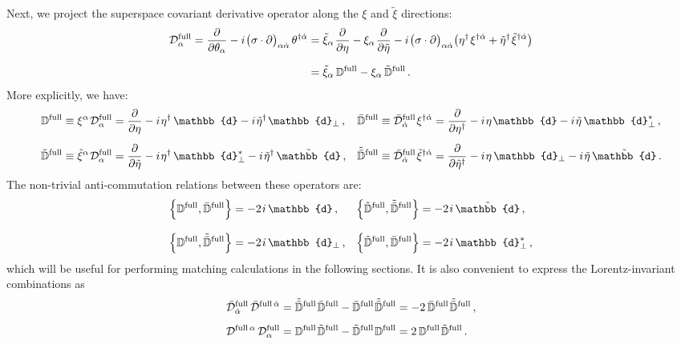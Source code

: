 \documentclass[12pt,document,nofootinbib,superscriptaddress,onecolumn,preprintnumbers,balancelastpage]{article}
\newcommand{\full}{\text{full}}
\newcommand{\s}{\hspace{0.8pt}}
\newcommand{\PP}{\mathbb{d}}
\newcommand{\D}{\mathbb{D}}
\begin{document}
\begin{spacing}{1.2}
Next, we project the superspace covariant derivative operator along the $\xi$ and $\tilde{\xi}$ directions:
%
\begin{align}
\mathcal{D}_\alpha^\full = \frac{\partial }{\partial \theta_\alpha} - i\s \big(\sigma \cdot \partial\big)_{\alpha \dot{\alpha}} \,\theta^{\dagger \dot{\alpha}} & =  \tilde{\xi}_\alpha\s \frac{\partial}{\partial \eta} - \xi_\alpha \s\frac{\partial}{\partial \tilde{\eta}} -i\s \big(\sigma \cdot \partial\big)_{\alpha \dot{\alpha}} \big(\eta^\dagger\s \xi^{\dagger \dot{\alpha}} + \tilde{\eta}^\dagger\s \tilde{\xi}^{\dagger \dot{\alpha}}\big) \notag\\[7pt] 
& =  \tilde{\xi}_\alpha\, \D^\full - \xi_\alpha\, \tilde{\D}^\full \, . 
\label{eq:DFullDecomposed}
\end{align}
%
More explicitly, we have:
%
\begin{align}
\label{eq:Dfull}
 \nonumber
\D^\full  \equiv \xi^\alpha\s \mathcal{D}_{\alpha}^\full &=    \frac{\partial}{\partial \eta} - i\s   \eta^\dagger\, \PP -i\s \tilde{\eta}^\dagger \s\PP_\perp \,, &
%
\bar{\D}^\full  \equiv \bar{\mathcal{D}}_{\dot{\alpha}}^\full\s \xi^{\dagger \dot{\alpha}} &=   \frac{\partial}{\partial \eta^\dagger}- i \s \eta\s \PP - i \s \tilde{\eta}\, \PP_\perp^* \,,\\[5pt]   
%
\tilde{\D}^\full  \equiv \tilde{\xi}^\alpha\s \mathcal{D}_{\alpha}^\full &=     \frac{\partial}{\partial \tilde{\eta}} - i\s \eta^\dagger\, \PP_\perp^* - i\s \tilde{\eta}^\dagger\, \tilde{\PP} \,, &
%
\tilde{\bar{\D}}^\full   \equiv \bar{\mathcal{D}}_{\dot{\alpha}}^\full\s \tilde{\xi}^{\dagger \dot{\alpha}} & = \frac{\partial}{\partial \tilde{\eta}^\dagger}- i\s  \eta\, \PP_\perp - i\s \tilde{\eta}\, \tilde{\PP}\,.
%
\end{align}
%
The non-trivial anti-commutation relations between these operators are:
%
\begin{align}
\Bigl\{\D^\full, \bar{\D}^\full \Bigr\} &= - 2\s i\, \PP \, ,&
\Bigl\{\tilde{\D}^\full, \tilde{\bar{\D}}^\full \Bigr\} &= - 2\s i\, \tilde{\PP}  \, , \nonumber \\[8pt] 
\Bigl\{\D^\full, \tilde{\bar{\D}}^\full \Bigr\} &= - 2\s i\, \PP_\perp \, ,&
\Bigl\{\tilde{\D}^\full, \bar{\D}^\full \Bigr\} &= - 2\s i\, \PP^*_\perp \, ,
\label{eq:DanticommAll}
\end{align}
%
which will be useful for performing matching calculations in the following sections.
%
It is also convenient to express the Lorentz-invariant combinations as
%
\begin{align}
\bar{\mathcal{D}}^\text{full}_{\dot{\alpha}}\, \bar{\mathcal{D}}^{\text{full}\,\dot{\alpha}}  &= \tilde{\bar{\D}}^\text{full}\s\bar{\D}^\text{full} -  \bar{\D}^\text{full}\s \tilde{\bar{\D}}^\text{full} = - 2\, \bar{\D}^\text{full}\s \tilde{\bar{\D}}^\text{full} \,, \notag\\[5pt]
\mathcal{D}^{\text{full}\,\alpha}\, \mathcal{D}^\text{full}_\alpha &= \D^\text{full}\s \tilde{\D}^\text{full} - \tilde{\D}^\text{full}\s \D^\text{full} = 2\,\D^\text{full}\s \tilde{\D}^\text{full} \,.
\label{eq:DsquaredSimplification}
\end{align}


\end{spacing}
\end{document}
